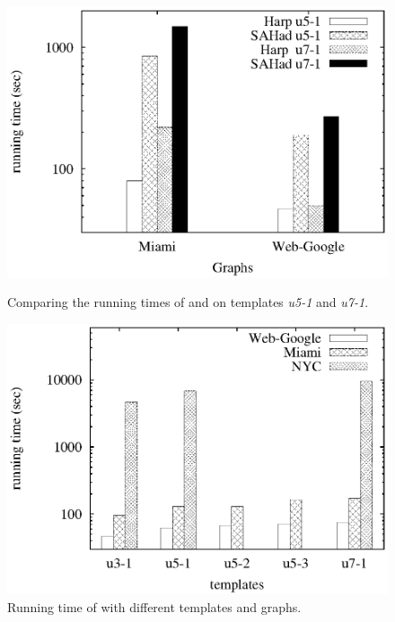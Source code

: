 \begin{figure}[htbp]
\hfill
\begin{minipage}[t]{0.45\linewidth}
\begin{center}
\centerline{\includegraphics[scale=0.35]{plots/harp-vs-sahad-40-threads.eps}}
\caption{Comparing the running times  of \harpsahad{} and \sahad{} on templates
\textit{u5-1} and \textit{u7-1}.}
\label{fig:harp-vs-sahad}
\end{center}
\end{minipage}
\hfill
\begin{minipage}[t]{0.45\linewidth}
\begin{center}
\centerline{\includegraphics[scale=0.35]{plots/harp-varying-templates-4-nodes-40-threads.eps}}
\caption{Running time of \harpsahad{} with different templates and graphs.}
\label{fig:harp-varying-templates}
\end{center}
\end{minipage}
\hfill
\end{figure}

